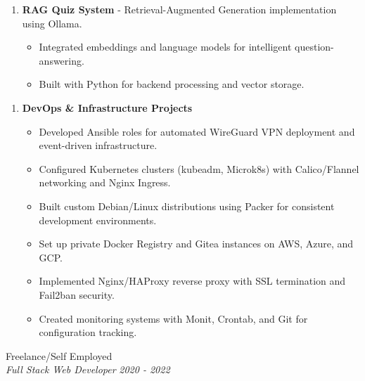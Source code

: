 \documentclass{article}
\begin{document}
\begin{enumerate}
    \item \textbf{RAG Quiz System} - Retrieval-Augmented Generation implementation using Ollama.
   \begin{itemize}
    \item Integrated embeddings and language models for intelligent question-answering.
    \item Built with Python for backend processing and vector storage.
   \end{itemize}
\end{enumerate}

\begin{enumerate}
    \item \textbf{DevOps \& Infrastructure Projects}
   \begin{itemize}
    \item Developed Ansible roles for automated WireGuard VPN deployment and event-driven infrastructure.
    \item Configured Kubernetes clusters (kubeadm, Microk8s) with Calico/Flannel networking and Nginx Ingress.
    \item Built custom Debian/Linux distributions using Packer for consistent development environments.
    \item Set up private Docker Registry and Gitea instances on AWS, Azure, and GCP.
    \item Implemented Nginx/HAProxy reverse proxy with SSL termination and Fail2ban security.
    \item Created monitoring systems with Monit, Crontab, and Git for configuration tracking.
   \end{itemize}
\end{enumerate}


\vspace{4.4em}
\vspace{0.4em}
\hspace{-2.em}
{\bf}Freelance/Self Employed  \hfill {} \\%
{\em Full Stack Web Developer } \hfill {\em 2020 - 2022 } %
\subsection*{}
\vspace{1.6em}
\end{document}
